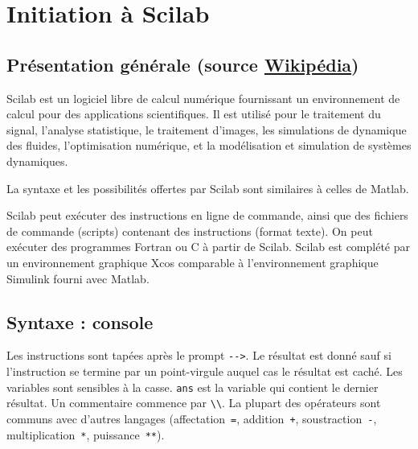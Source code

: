 \chapter{Initiation à Scilab\label{annexe-scilab}}

\section[Présentation générale]{Présentation générale (source \href{https://fr.wikipedia.org/wiki/Scilab}{Wikipédia})}
Scilab est un logiciel libre
de calcul numérique fournissant un environnement de
calcul pour des applications scientifiques. 
Il est utilisé pour le traitement 
du signal, l'analyse statistique, 
le traitement d'images, les simulations de 
dynamique des fluides, l'optimisation numérique, et la 
modélisation et simulation de systèmes dynamiques.

La syntaxe et les possibilités offertes par Scilab sont 
similaires à celles de Matlab.

Scilab peut exécuter des instructions en ligne de commande, ainsi que 
des fichiers de commande (scripts) contenant des instructions (format texte). 
On peut exécuter des programmes Fortran ou C à partir de Scilab.
Scilab est complété par un environnement graphique Xcos comparable 
à l'environnement graphique Simulink fourni avec Matlab. 

\newpage
\section{Syntaxe : console}
Les instructions sont tapées après le prompt \verb?-->?. Le résultat est donné sauf si l'instruction se termine par 
un point-virgule auquel cas le résultat est caché.
Les variables sont sensibles à la casse.
\verb?ans? est la variable qui contient le dernier résultat.
Un commentaire commence par  \verb?\\?. 
La plupart des opérateurs sont communs avec d'autres langages (affectation~\verb?=?, addition~\verb?+?, soustraction~\verb?-?, multiplication~\verb?*?, puissance~\verb?**?).

